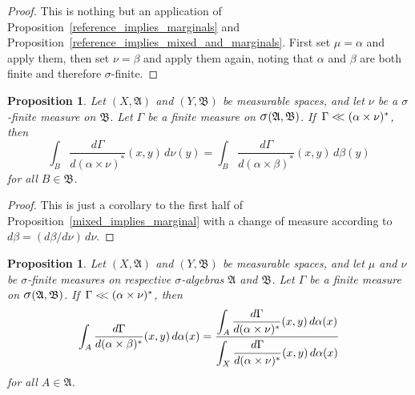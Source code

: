 \documentclass[
twoside=true,
paper=letter,
fontsize=9pt,
pagesize=auto,
leqno,
openany,
headsepline,
overfullrule,
]{scrbook}
\theoremstyle{plain}
\theoremstyle{plain}
\newtheorem{prop}[thm]{Proposition}
\theoremstyle{definition}
\theoremstyle{bfnoteitalic}
\theoremstyle{bfnoteroman}
\newcommand{\sigalg}[1]{\mathfrak{#1}}
\newcommand{\sagb}{\mathop{\hbox{\large{$\sigma$}}}\nolimits}
\newcommand{\textsigma}{\hbox{\large{$\sigma$}}\kern-1pt}
\newcommand{\sigmaalgebra}{\sigalg{A}}
\newcommand{\sigmaalgebraii}{\sigalg{B}}
\newcommand{\productsig}[2]{\sagb(#1,#2)}
\newcommand{\lilstrut}{\vphantom{\bigl(}}
\newcommand{\measurespace}{X}
\newcommand{\measurespaceii}{Y}
\newcommand{\mspaceelt}{x}
\newcommand{\mspaceeltii}{y}
\newcommand{\abscont}{\mathrel{< \kern-3.5pt <}}
\newcommand{\measure}{\mu}
\newcommand{\measmu}{\mu}
\newcommand{\measureii}{\nu}
\newcommand{\measnu}{\nu}
\newcommand{\seti}{A}
\newcommand{\setii}{B}
\newcommand{\measonprod}{\Gamma}%
\newcommand{\marginalone}{\alpha}%
\newcommand{\marginaltwo}{\beta}%
\begin{document}
\begin{proof}
This is nothing but an application of Proposition~\ref{reference_implies_marginals} and Proposition~\ref{reference_implies_mixed_and_marginals}. First set $\measmu=\marginalone$ and apply them, then set $\measnu=\marginaltwo$ and apply them again, noting that $\marginalone$ and $\marginaltwo$ are both finite and therefore \textsigma\hyp{}finite.
\end{proof}


\begin{prop}\label{mixed_implies_miracle}
Let
$(\measurespace, \sigmaalgebra)$
and
$(\measurespaceii, \sigmaalgebraii)$
be measurable spaces,
and let $\measnu$
be a \textsigma-finite measure on $\sigmaalgebraii$.
Let $\measonprod$ be a finite measure on
$\productsig{\sigmaalgebra}{\sigmaalgebraii}$.
If\,
$\measonprod \abscont (\marginalone\times\measnu)^*$, then
\[
\int_\setii
\dfrac{d\measonprod}{d(\marginalone\times\measnu)^*}(\mspaceelt,\mspaceeltii)
\, d\measnu(\mspaceeltii)
=
\int_\setii
\dfrac{d\measonprod}{d(\marginalone\times\marginaltwo)^*}(\mspaceelt,\mspaceeltii)
\, d\marginaltwo(\mspaceeltii)
\]
for all $\setii \in \sigmaalgebraii$.
\end{prop}

\begin{proof}
This is just a corollary to the first half of Proposition~\ref{mixed_implies_marginal}
with a change of measure according to
$d\marginaltwo = (d\marginaltwo / d\measnu)\, d\measnu$.
\end{proof}



\begin{prop}\label{mixed_implies_half}
Let
$(\measurespace, \sigmaalgebra)$
and
$(\measurespaceii, \sigmaalgebraii)$
be measurable spaces, and let $\measure$ and $\measureii$
be \textsigma-finite measures on  respective \textsigma-algebras
$\sigmaalgebra$ and $\sigmaalgebraii$.
Let $\measonprod$ be a finite measure on
$\productsig{\sigmaalgebra}{\sigmaalgebraii}$.
If\,
$\measonprod \abscont (\marginalone\times\measnu)^*$, then
\[
\int_\seti
\frac{d\measonprod}{d(\marginalone\times\marginaltwo)^*}
(\mspaceelt,\mspaceeltii)\,d\marginalone(\mspaceelt)
=
\frac{\displaystyle
\int_\seti
\dfrac{d\measonprod}{d(\marginalone\times\measnu)^*}(\mspaceelt,\mspaceeltii)
\,d\marginalone(\mspaceelt)
}
{\displaystyle
\int_\measurespace
\dfrac{d\measonprod\lilstrut}{d(\marginalone\times\measnu)^*}(\mspaceelt,\mspaceeltii)
\,d\marginalone(\mspaceelt)
}
\]
for all $\seti\in\sigmaalgebra$.
\end{prop}
\end{document}
